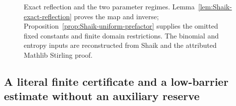 \begin{figure}[ht]
\centering
{}
\caption{Exact reflection and the two parameter regimes.
Lemma~\ref{lem:Shaik-exact-reflection} proves the map and inverse;
Proposition~\ref{prop:Shaik-uniform-prefactor} supplies the omitted
fixed constants and finite domain restrictions. The binomial and
entropy inputs are reconstructed from Shaik \cite{Shaik2026v324}
and the attributed Mathlib Stirling proof.}
\end{figure}

\subsection{A literal finite certificate and a low-barrier estimate without an auxiliary reserve}

